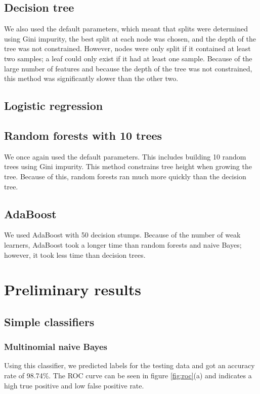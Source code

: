 \documentclass{article} %
\begin{document}
\subsection{Decision tree}
We also used the default parameters, which meant that splits were determined using Gini impurity, the best split at each node was chosen, and the depth of the tree was not constrained. However, nodes were only split if it contained at least two samples; a leaf could only exist if it had at least one sample. Because of the large number of features and because the depth of the tree was not constrained, this method was significantly slower than the other two. 

\subsection{Logistic regression} 

\subsection{Random forests with 10 trees}
We once again used the default parameters. This includes building 10 random trees using Gini impurity. This method constrains tree height when growing the tree. Because of this, random forests ran much more quickly than the decision tree.

\subsection{AdaBoost}
We used AdaBoost with 50 decision stumps. Because of the number of weak learners, AdaBoost took a longer time than random forests and naive Bayes; however, it took less time than decision trees. 

\section{Preliminary results}
\subsection{Simple classifiers}
\subsubsection{Multinomial naive Bayes}
Using this classifier, we predicted labels for the testing data and got an accuracy rate of 98.74\%. The ROC curve can be seen in figure \ref{fig:roc}(a) and indicates a high true positive and low false positive rate.
\end{document}
